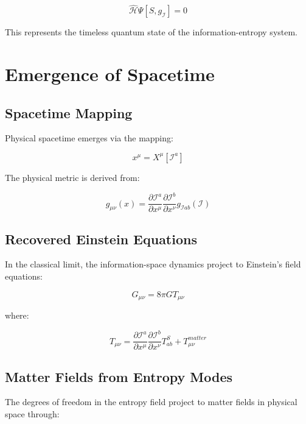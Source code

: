 \documentclass{article}
\begin{document}
\begin{equation}
\hat{\mathcal{H}}\Psi[S, g_\mathcal{I}] = 0
\end{equation}

This represents the timeless quantum state of the information-entropy system.

\section{Emergence of Spacetime}

\subsection{Spacetime Mapping}

Physical spacetime emerges via the mapping:

\begin{equation}
x^\mu = X^\mu[\mathcal{I}^a]
\end{equation}

The physical metric is derived from:

\begin{equation}
g_{\mu\nu}(x) = \frac{\partial \mathcal{I}^a}{\partial x^\mu}\frac{\partial \mathcal{I}^b}{\partial x^\nu}g_{\mathcal{I}ab}(\mathcal{I})
\end{equation}

\subsection{Recovered Einstein Equations}

In the classical limit, the information-space dynamics project to Einstein's field equations:

\begin{equation}
G_{\mu\nu} = 8\pi G T_{\mu\nu}
\end{equation}

where:

\begin{equation}
T_{\mu\nu} = \frac{\partial \mathcal{I}^a}{\partial x^\mu}\frac{\partial \mathcal{I}^b}{\partial x^\nu}T_{ab}^S + T_{\mu\nu}^{matter}
\end{equation}

\subsection{Matter Fields from Entropy Modes}

The degrees of freedom in the entropy field project to matter fields in physical space through:
\end{document}
